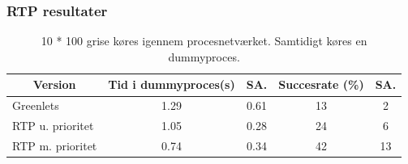 \documentclass[12pt]{beamer}
\newcommand\mc[1]{\multicolumn{1}{c}{\textbf {#1}}} %
\begin{document}



\begin{frame}
  	\frametitle{RTP resultater}
	\tiny 
	\begin{table}[htbp]
		\centering
		\begin{tabular}{lcccc}
		   	\toprule
		    \mc{Version}&\mc{Tid i dummyproces(s)}&\mc{SA.}& \mc{Succesrate (\%)}&\mc{SA.}\\
		    \midrule
		    Greenlets         & 1.29 & 0.61 & 13 & 2  \\
		    RTP u. prioritet  & 1.05 & 0.28 & 24 & 6  \\
		    RTP m. prioritet  & 0.74 & 0.34 & 42 & 13 \\
		    \bottomrule
		\end{tabular}
		\caption[]{\tiny 10 * 100 grise køres igennem procesnetværket. Samtidigt køres en dummyproces.}
	\end{table}
\end{frame}
\end{document}
